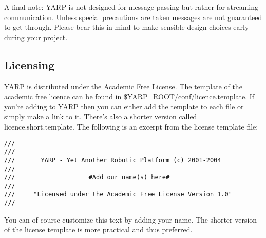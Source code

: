 A final note: YARP is not designed for message passing but rather for streaming communication. Unless special precautions are taken messages are not guaranteed to get through. Please bear this in mind to make sensible design choices early during your project.

\subsection{Licensing}
YARP is distributed under the Academic Free License. The template of the academic
free licence can be found in \$YARP\_ROOT/conf/licence.template. If you're adding to YARP then you can either add the template to each file or simply make a link to it. There's also a shorter version called licence.short.template. The following is an excerpt from the license template file:

\begin{verbatim}
///
///
///       YARP - Yet Another Robotic Platform (c) 2001-2004 
///
///                    #Add our name(s) here#
///
///     "Licensed under the Academic Free License Version 1.0"
///
\end{verbatim}

You can of course customize this text by adding your name. The shorter version of the license template is more practical and thus preferred.